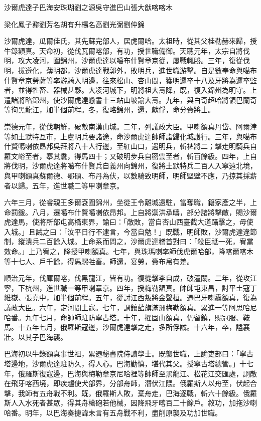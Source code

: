
\begin{pinyinscope}
沙爾虎達子巴海安珠瑚劉之源吳守進巴山張大猷喀喀木

梁化鳳子鼐劉芳名胡有升楊名高劉光弼劉仲錦

沙爾虎達，瓜爾佳氏，其先蘇完部人，居虎爾哈。太祖時，從其父桂勒赫來歸，授牛錄額真。天命初，從伐瓦爾喀部，有功，授世職備御。天聰元年，太宗自將伐明，攻大凌河，圍錦州，沙爾虎達以噶布什賢章京從，屢戰輒勝。三年，復從伐明，拔遵化，薄明都，沙爾虎達戰郭外，敗明兵，進世職游擊。自是數奉命與噶布什賢章京勞薩等率游騎入明邊，往來松山、杏山間，獲明邏卒十八及牙將為邏卒監者，並得牲畜、器械甚夥。大凌河城下，明將祖大壽降，既，復入錦州為明守。上遣諸將略錦州，使沙爾虎達懸書十三站山坡諭大壽。九年，與白奇超哈將領巴蘭奇等徇黑龍江，加半個前程。冬，復略錦州，還，獻俘，命分賚將士。

崇德元年，從伐朝鮮，破敵南漢山城。二年，列議政大臣。甲喇額真丹岱、阿爾津等如土默特互市，上盧明兵要諸途，命沙爾虎達帥師詣歸化城護行。三年，與噶布什賢噶喇依昂邦吳拜將八十人行邊，至紅山口，遇明兵，斬裨將二；擊走明騎兵自羅文峪至者，搴其纛，得馬四十；又破明步兵自密雲至者，斬百餘級。四年，上自將伐明，沙爾虎達將噶布什賢兵自義州向錦州，復將土默特兵二百人入寧遠北境，與甲喇額真蘇爾德、鄂碩、布丹為伏，以數騎致明師，明師堅壁不應，乃掠其採薪者以歸。五年，進世職二等甲喇章京。

六年三月，從睿親王多爾袞圍錦州，坐從王令離城遠駐，當奪職，籍家產之半，上命罰鍰。八月，遷噶布什賢噶喇依昂邦。上自將禦洪承疇，部分諸將擊敵，賜沙爾虎達馬，使將所部屯高橋東界，諭曰：「敵敗，當自杏山西臺截大道躡擊之，毋使入城。」且誡之曰：「汝平日行不逮言，今當自勉！」既戰，明師敗，沙爾虎達違節制，縱潰兵二百餘入城。上命系而問之，沙爾虎達稽首對曰：「殺臣祗一死，宥當效命。」上乃宥之，降授甲喇額真。七年，與珠瑪喇率師伐虎爾哈部，降喀爾喀木等十七人、戶千餘，得馬騾牲畜。師還，宴勞，賚布帛有差。

順治元年，伐庫爾喀，伐黑龍江，皆有功。復從擊李自成，破潼關。二年，從攻江寧，下杭州，進世職一等甲喇章京。四年，授梅勒額真。帥師屯東昌，討平土寇丁維嶽、張堯中，加半個前程。五年，從討江西叛將金聲桓。遷巴牙喇纛額真，復為議政大臣。六年，定河間土寇。七年，調鑲藍旗滿洲梅勒額真。累進一等阿思哈尼哈番。九年七月，命帥師駐防寧古塔。十年，擢固山額真，仍留鎮，賜冠服、鞍馬。十五年七月，俄羅斯寇邊，沙爾虎達擊之走，多所俘馘。十六年，卒，謚襄壯。以其子巴海襲。

巴海初以牛錄額真事世祖，累遷秘書院侍讀學士。既襲世職，上諭吏部曰：「寧古塔邊地，沙爾虎達駐防久，得人心。巴海勤慎，堪代其父。授寧古塔總管。」十七年，俄羅斯復寇邊，巴海與梅勒章京尼哈裡等帥師至黑龍江、松花江交匯處，詗敵在飛牙喀西境，即疾趨使犬部界，分部舟師，潛伏江隈。俄羅斯人以舟至，伏起合擊，我師有五舟戰不利。既，俄羅斯人敗，棄舟走，巴海逐戰，斬六十餘級。俄羅斯人入水死者甚眾，得其舟槍砲若他械，因降飛牙喀百二十餘戶。敘功，加拖沙喇哈番。明年，以巴海奏捷諱未言有五舟戰不利，盡削原襲及功加世職。


\end{pinyinscope}
